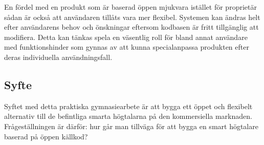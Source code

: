 En fördel med en produkt som är baserad öppen mjukvara istället för proprietär sådan är också att användaren tillåts vara mer flexibel. Systemen kan ändras helt efter användarens behov och önskningar eftersom kodbasen är fritt tillgänglig att modifiera. Detta kan tänkas spela en väsentlig roll för bland annat användare med funktionshinder som gynnas av att kunna specialanpassa produkten efter deras individuella användningsfall.

\subsection{Syfte}
Syftet med detta praktiska gymnasiearbete är att bygga ett öppet och flexibelt alternativ till de befintliga smarta högtalarna på den kommersiella marknaden. Frågeställningen är därför: hur går man tillväga för att bygga en smart högtalare baserad på öppen källkod?

